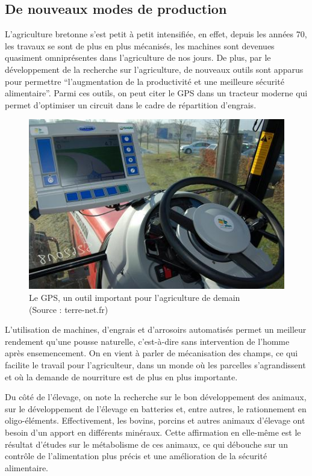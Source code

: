 \documentclass[a4paper,12pt]{report}
\begin{document}
		\subsection{De nouveaux modes de production}
			L’agriculture bretonne s’est petit à petit intensifiée, en effet, depuis les années 70, les travaux se sont de plus en plus mécanisés, les machines sont devenues quasiment omniprésentes dans l’agriculture de nos jours. De plus, par le développement de la recherche sur l’agriculture, de nouveaux outils sont apparus pour permettre “l’augmentation de la productivité et une meilleure sécurité alimentaire”\cite{FAOStatisticalYearbook2013}. Parmi ces outils, on peut citer le GPS dans un tracteur moderne\cite{RobotsChamps} qui permet d’optimiser un circuit dans le cadre de répartition d’engrais.
			
			\begin{figure}[!h]
			\centering
			\includegraphics[width = 200 pt]{Illustrations/GPS_Tracteur.jpg}
			\caption{Le GPS, un outil important pour l'agriculture de demain\\(Source : terre-net.fr\cite{GPSEtTracteur})}
			\label{GPSTracteur}
			\end{figure}
			
			L’utilisation de machines, d’engrais et d’arrosoirs automatisés permet un meilleur rendement qu’une pousse naturelle, c’est-à-dire sans intervention de l’homme après ensemencement. On en vient à parler de mécanisation des champs, ce qui facilite le travail pour l’agriculteur, dans un monde où les parcelles s’agrandissent et où la demande de nourriture est de plus en plus importante.
			
			Du côté de l’élevage, on note la recherche sur le bon développement des animaux, sur le développement de l’élevage en batteries et, entre autres, le rationnement en oligo-éléments\cite{OligoElements}. Effectivement, les bovins, porcins et autres animaux d’élevage ont besoin d’un apport en différents minéraux. Cette affirmation en elle-même est le résultat d’études sur le métabolisme de ces animaux, ce qui débouche sur un contrôle de l’alimentation plus précis et une amélioration de la sécurité alimentaire.
			
\end{document}
